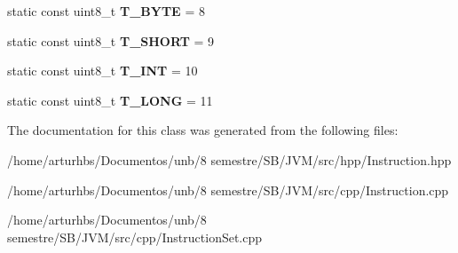 \begin{DoxyCompactItemize}
\item 
static const uint8\+\_\+t {\bfseries T\+\_\+\+B\+Y\+TE} = 8\hypertarget{classInstruction_a4876cb8e45c582139e36ddb52c2b1377}{}\label{classInstruction_a4876cb8e45c582139e36ddb52c2b1377}

\item 
static const uint8\+\_\+t {\bfseries T\+\_\+\+S\+H\+O\+RT} = 9\hypertarget{classInstruction_a49747a04fe643bf002fa28f6f18ba2ab}{}\label{classInstruction_a49747a04fe643bf002fa28f6f18ba2ab}

\item 
static const uint8\+\_\+t {\bfseries T\+\_\+\+I\+NT} = 10\hypertarget{classInstruction_a987ec288d2592900e11d72bf4cf0c296}{}\label{classInstruction_a987ec288d2592900e11d72bf4cf0c296}

\item 
static const uint8\+\_\+t {\bfseries T\+\_\+\+L\+O\+NG} = 11\hypertarget{classInstruction_a9ce90541fd52ac9f175536f993ea9d8f}{}\label{classInstruction_a9ce90541fd52ac9f175536f993ea9d8f}

\end{DoxyCompactItemize}


The documentation for this class was generated from the following files\+:\begin{DoxyCompactItemize}
\item 
/home/arturhbs/\+Documentos/unb/8 semestre/\+S\+B/\+J\+V\+M/src/hpp/Instruction.\+hpp\item 
/home/arturhbs/\+Documentos/unb/8 semestre/\+S\+B/\+J\+V\+M/src/cpp/Instruction.\+cpp\item 
/home/arturhbs/\+Documentos/unb/8 semestre/\+S\+B/\+J\+V\+M/src/cpp/Instruction\+Set.\+cpp\end{DoxyCompactItemize}

